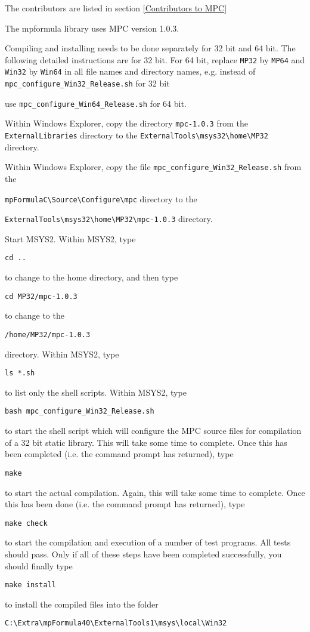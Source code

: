 The contributors are listed in section \ref{Contributors to MPC}

The mpformula library uses MPC version 1.0.3.


\vpara
Compiling and installing needs to be done separately for 32 bit and 64 bit. The following detailed instructions are for 32 bit. For 64 bit, replace \verb|MP32| by \verb|MP64| and \verb|Win32| by  \verb|Win64| in all file names and directory names, e.g. instead of \verb|mpc_configure_Win32_Release.sh| for 32 bit

use \verb|mpc_configure_Win64_Release.sh| for 64 bit.

\vpara
Within Windows Explorer, copy the directory \verb|mpc-1.0.3|  from the \verb|ExternalLibraries|
directory to the \verb|ExternalTools\msys32\home\MP32| directory. 

\vpara
Within Windows Explorer, copy the file \verb|mpc_configure_Win32_Release.sh|  from the

\verb|mpFormulaC\Source\Configure\mpc| directory to the 

\verb|ExternalTools\msys32\home\MP32\mpc-1.0.3| directory.  


\vpara
Start MSYS2. Within MSYS2, type
\begin{verbatim}
cd ..
\end{verbatim}
to change to the home directory, and then type 
\begin{verbatim}
cd MP32/mpc-1.0.3
\end{verbatim}
to change to the
\begin{verbatim}
/home/MP32/mpc-1.0.3
\end{verbatim}
directory. Within MSYS2, type
\begin{verbatim}
ls *.sh
\end{verbatim}
to list only the shell scripts. Within MSYS2, type
\begin{verbatim}
bash mpc_configure_Win32_Release.sh
\end{verbatim}
to start the shell script which will configure the MPC source files for compilation of a 32 bit static library. This will take some time to complete. Once this has been completed (i.e. the command prompt has returned), type
\begin{verbatim}
make
\end{verbatim}
to start the actual compilation. Again, this will take some time to complete. Once this has been done (i.e. the command prompt has returned), type
\begin{verbatim}
make check
\end{verbatim}
to start the compilation and execution of a number of test programs. All tests should pass. Only if all of these steps have been completed successfully, you should finally type
\begin{verbatim}
make install
\end{verbatim}
to install the compiled files into the folder
\begin{verbatim}
C:\Extra\mpFormula40\ExternalTools1\msys\local\Win32
\end{verbatim}




